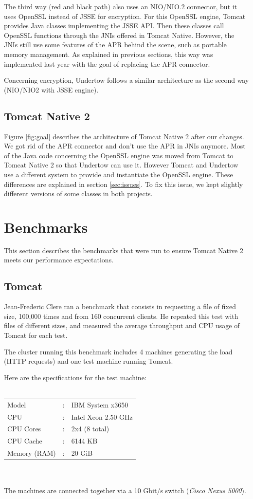 \documentclass[11pt,a4paper,bibliography=totocnumbered]{scrartcl}
\def\mytitle{Tomcat Native 2}
\begin{document}
The third way (red and black path) also uses an NIO/NIO.2 connector, but it uses OpenSSL instead of JSSE for encryption. For this OpenSSL engine, Tomcat provides Java classes implementing the JSSE API. Then these classes call OpenSSL functions through the JNIs offered in Tomcat Native. However, the JNIs still use some features of the APR behind the scene, such as portable memory management. As explained in previous sections, this way was implemented last year with the goal of replacing the APR connector.

Concerning encryption, Undertow follows a similar architecture as the second way (NIO/NIO2 with JSSE engine).

\subsection{Tomcat Native 2}
Figure \ref{fig:goal} describes the architecture of \mytitle{} after our changes. We got rid of the APR connector and don't use the APR in JNIs anymore. Most of the Java code concerning the OpenSSL engine was moved from Tomcat to \mytitle{} so that Undertow can use it. However Tomcat and Undertow use a different system to provide and instantiate the OpenSSL engine. These differences are explained in section \ref{sec:issues}. To fix this issue, we kept slightly different versions of some classes in both projects.

\section{Benchmarks}
This section describes the benchmarks that were run to ensure \mytitle{} meets our performance expectations.
\subsection{Tomcat}
Jean-Frederic Clere ran a benchmark that consists in requesting a file of fixed size, 100,000 times and from 160 concurrent clients. He repeated this test with files of different sizes, and measured the average throughput and CPU usage of Tomcat for each test.

The cluster running this benchmark includes 4 machines generating the load (HTTP requests) and one test machine running Tomcat.

Here are the specifications for the test machine:
\\
\\
\begin{tabular}{lrl}
	Model&: & IBM System x3650 \\ 
	CPU&: & Intel Xeon 2.50 GHz \\
	CPU Cores&: & 2x4 (8 total) \\
	CPU Cache&: & 6144 KB \\
	Memory (RAM)&: & 20 GiB \\ 
\end{tabular} 
\\
\\
The machines are connected together via a 10 Gbit/s switch (\textit{Cisco Nexus 5000}).
\end{document}
